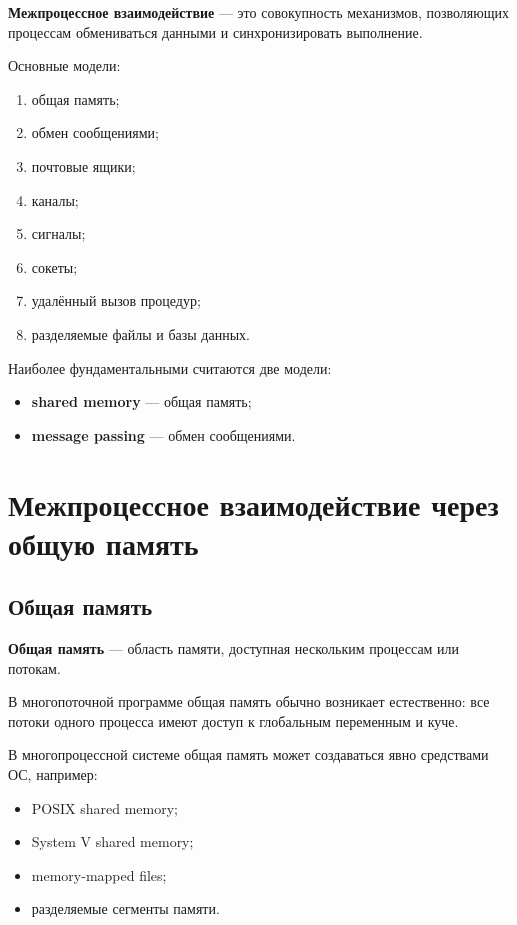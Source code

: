\documentclass[12pt,a4paper]{article}
\begin{document}
\textbf{Межпроцессное взаимодействие} --- это совокупность механизмов, позволяющих процессам обмениваться данными и синхронизировать выполнение.

Основные модели:
\begin{enumerate}
    \item общая память;
    \item обмен сообщениями;
    \item почтовые ящики;
    \item каналы;
    \item сигналы;
    \item сокеты;
    \item удалённый вызов процедур;
    \item разделяемые файлы и базы данных.
\end{enumerate}

Наиболее фундаментальными считаются две модели:
\begin{itemize}
    \item \textbf{shared memory} --- общая память;
    \item \textbf{message passing} --- обмен сообщениями.
\end{itemize}

\section{Межпроцессное взаимодействие через общую память}

\subsection{Общая память}

\textbf{Общая память} --- область памяти, доступная нескольким процессам или потокам.

В многопоточной программе общая память обычно возникает естественно: все потоки одного процесса имеют доступ к глобальным переменным и куче.

В многопроцессной системе общая память может создаваться явно средствами ОС, например:
\begin{itemize}
    \item POSIX shared memory;
    \item System V shared memory;
    \item memory-mapped files;
    \item разделяемые сегменты памяти.
\end{itemize}
\end{document}
